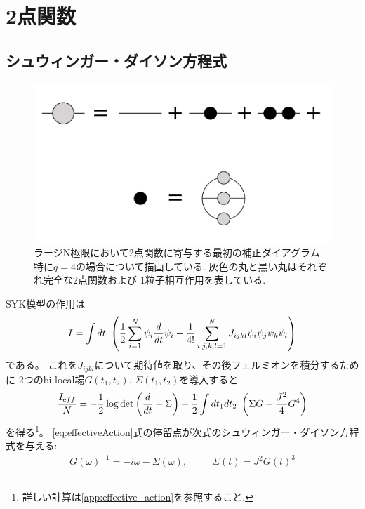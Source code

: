 \section{2点関数}
\subsection{シュウィンガー・ダイソン方程式}
\begin{figure}[ht]
  \centering
  \includegraphics[width=14cm]{figures/melonDiagram}
  \caption{ラージN極限において2点関数に寄与する最初の補正ダイアグラム.
  特に$q=4$の場合について描画している. 灰色の丸と黒い丸はそれぞれ完全な2点関数および
  1粒子相互作用を表している.}
  \label{fig:melonDiagram}
\end{figure}

SYK模型の作用は
\begin{align}
  I = \int dt\ \left(\frac{1}{2}\sum_{i = 1}^{N} \psi_i \frac{d}{dt} \psi_i
		- \frac{1}{4!} \sum_{i,j,k,l = 1}^{N} J_{ijkl} \psi_i\psi_j\psi_k\psi_l
    \right)
\end{align}
である。
これを$J_{ijkl}$について期待値を取り、その後フェルミオンを積分するために
2つのbi-local場$G(t_1, t_2)$, $\Sigma(t_1, t_2)$を導入すると
\begin{align}
  \frac{I_{\mathrm eff}}{N} =
		- \frac{1}{2}\log\det\left(\frac{d}{dt} - \Sigma\right)
		+ \frac{1}{2}\int dt_1dt_2\ \left(\Sigma G - \frac{J^2}{4}G^4\right)
  \label{eq:effectiveAction}
\end{align}
を得る\footnote{詳しい計算は\ref{app:effective_action}を参照すること.}。
\eqref{eq:effectiveAction}式の停留点が次式のシュウィンガー・ダイソン方程式を与える:
\begin{align}
  G(\omega)^{-1} = -i\omega - \Sigma(\omega),
  \hspace{30pt}
  \Sigma(t) = J^2G(t)^3
  \label{eq:SDeq}
\end{align}

